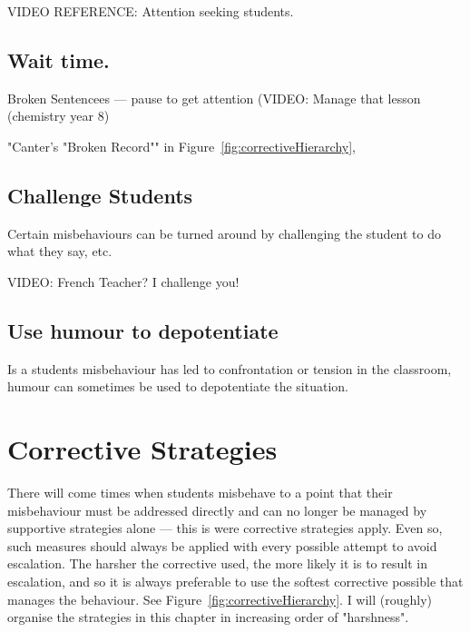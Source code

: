 \documentclass[12pt]{report}
\begin{document}
VIDEO REFERENCE: Attention seeking students. 



\section{Wait time.}
\label{sec:wait_time_s}

Broken Sentencees --- pause to get attention (VIDEO: Manage that lesson (chemistry year 8)

"Canter's "Broken Record"" in Figure~\ref{fig:correctiveHierarchy}, 


\section{Challenge Students}
\label{sec:challenge_s}

Certain misbehaviours can be turned around by challenging the student to do what they say, etc. 

VIDEO: French Teacher? I challenge you! 

\section{Use humour to depotentiate}
\label{sec:humour_s}

Is a students misbehaviour has led to confrontation or tension in the classroom, humour can sometimes be used to depotentiate the situation.

























\chapter{Corrective Strategies}
\label{chap:corrective}

There will come times when students misbehave to a point that their misbehaviour must be addressed directly and can no longer be managed by supportive strategies alone --- this is were corrective strategies apply. Even so, such measures should always be applied with every possible attempt to avoid escalation. The harsher the corrective used, the more likely it is to result in escalation, and so it is always preferable to use the softest corrective possible that manages the behaviour. See Figure~\ref{fig:correctiveHierarchy}. I will (roughly) organise the strategies in this chapter in increasing order of "harshness".
\end{document}
